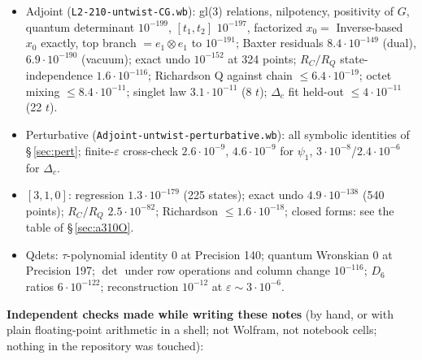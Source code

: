\documentclass[10pt]{article}
\newcommand{\nb}[1]{\texttt{#1}}
\begin{document}
\begin{itemize}\setlength{\itemsep}{1pt}
\item Adjoint (\nb{L2-\allowbreak{}210-\allowbreak{}untwist-\allowbreak{}CG.\allowbreak{}wb}): gl(3) relations, nilpotency, positivity of $G$, quantum determinant $10^{-199}$, $[t_1,t_2]$ $10^{-197}$, factorized $x_0=$ Inverse-based $x_0$ exactly, top branch $=e_1\otimes e_1$ to $10^{-191}$; Baxter residuals $8.4\cdot10^{-149}$ (dual), $6.9\cdot10^{-190}$ (vacuum); exact undo $10^{-152}$ at 324 points; $R_C/R_Q$ state-independence $1.6\cdot10^{-116}$; Richardson Q against chain $\le6.4\cdot10^{-19}$; octet mixing $\le8.4\cdot10^{-11}$; singlet law $3.1\cdot10^{-11}$ (8 $t$); $\Delta_c$ fit held-out $\le4\cdot10^{-11}$ (22 $t$).
\item Perturbative (\nb{Adjoint-\allowbreak{}untwist-\allowbreak{}perturbative.\allowbreak{}wb}): all symbolic identities of \S\,\ref{sec:pert}; finite-$\varepsilon$ cross-check $2.6\cdot10^{-9}$, $4.6\cdot10^{-9}$ for $\psi_1$, $3\cdot10^{-8}$/$2.4\cdot10^{-6}$ for $\Delta_c$.
\item $[3,1,0]$: regression $1.3\cdot10^{-179}$ (225 states); exact undo $4.9\cdot10^{-138}$ (540 points); $R_C/R_Q$ $2.5\cdot10^{-82}$; Richardson $\le1.6\cdot10^{-18}$; closed forms: see the table of \S\,\ref{sec:a310O}.
\item Qdets: $\tau$-polynomial identity $0$ at Precision 140; quantum Wronskian $0$ at Precision 197; $\det$ under row operations and column change $10^{-116}$; $D_6$ ratios $6\cdot10^{-122}$; reconstruction $10^{-12}$ at $\varepsilon\sim3\cdot10^{-6}$.
\end{itemize}

\textbf{Independent checks made while writing these notes} (by hand, or with plain floating-point arithmetic in a shell; not Wolfram, not notebook cells; nothing in the repository was touched):
\end{document}
